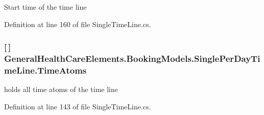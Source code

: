 Start time of the time line 



Definition at line 160 of file Single\+Time\+Line.\+cs.

\subsubsection[{\texorpdfstring{Time\+Atoms}{TimeAtoms}}]{ \mbox{[}$\,$\mbox{]} General\+Health\+Care\+Elements.\+Booking\+Models.\+Single\+Per\+Day\+Time\+Line.\+Time\+Atoms\hspace{0.3cm}{\ttfamily [get]}}\hypertarget{class_general_health_care_elements_1_1_booking_models_1_1_single_per_day_time_line_ab5f24ec2783b805510d1579fdbcf32aa}{}\label{class_general_health_care_elements_1_1_booking_models_1_1_single_per_day_time_line_ab5f24ec2783b805510d1579fdbcf32aa}


holds all time atoms of the time line 



Definition at line 143 of file Single\+Time\+Line.\+cs.

